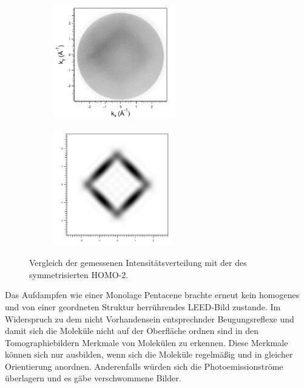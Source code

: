         \begin{figure}
            \centering
            \begin{subfigure}[t]{0.48\textwidth}
                \centering
                \includegraphics[height=5cm]{./content/pictures/FeO+5A/FeO_5A_30_95eV.png}
            \end{subfigure}
            \begin{subfigure}[t]{0.48\textwidth}
                \centering
                \includegraphics[height=5cm]{./content/pictures/FeO+5A/MO_HOMO2_RT_RT.png}
            \end{subfigure}
            \caption{Vergleich der gemessenen Intensitätsverteilung mit der des symmetrisierten HOMO-2.}
            \label{fig:FeO5A4}
        \end{figure}
        Das Aufdampfen wie einer Monolage Pentacene brachte erneut kein homogenes und von einer geordneten Struktur herrührendes LEED-Bild zustande.
        Im Widerspruch zu dem nicht Vorhandensein entsprechnder Beugungsreflexe und damit sich die Moleküle nicht auf der Oberfläche ordnen sind in den Tomographiebildern Merkmale von Molekülen zu erkennen.
        Diese Merkmale können sich nur ausbilden, wenn sich die Moleküle regelmäßig und in gleicher Orientierung anordnen.
        Anderenfalls würden sich die Photoemissionströme überlagern und es gäbe verschwommene Bilder.
